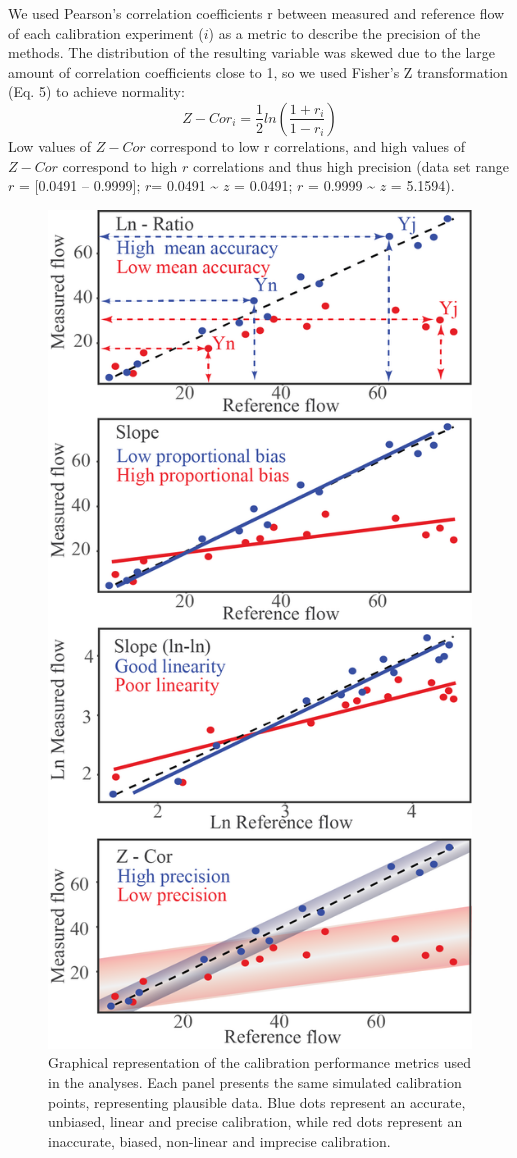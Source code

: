 \documentclass[11pt,twoside]{reedthesis}
\begin{document}
We used Pearson's correlation coefficients r between measured and
reference flow of each calibration experiment (\(i\)) as a metric to
describe the precision of the methods. The distribution of the resulting
variable was skewed due to the large amount of correlation coefficients
close to 1, so we used Fisher's Z transformation (Eq. 5) to achieve
normality:
\begin{equation}
Z-Cor_i = \frac{1}{2}ln(\frac{1+r_i}{1-r_i})
\end{equation}
Low values of \(Z-Cor\) correspond to low r correlations, and high
values of \(Z-Cor\) correspond to high \(r\) correlations and thus high
precision (data set range \(r\) = {[}0.0491 -- 0.9999{]}; \(r\)= 0.0491
\textasciitilde{} \(z\) = 0.0491; \(r\) = 0.9999 \textasciitilde{} \(z\)
= 5.1594).\par
\begin{figure}[hbt!]

{\centering \includegraphics[width=0.55\linewidth]{figure/CH2/PLOTMETRICS} 

}

\caption[Graphical representation of the calibration performance metrics.]{Graphical representation of the calibration performance metrics used in the analyses. Each panel presents the same simulated calibration points, representing plausible data. Blue dots represent an accurate, unbiased, linear and precise calibration, while red dots represent an inaccurate, biased, non-linear and imprecise calibration.}\label{fig:ch2fig1}
\end{figure}
\end{document}
